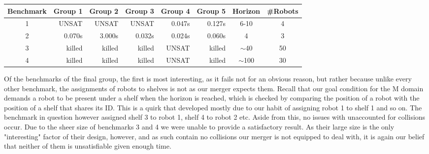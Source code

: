\documentclass{llncs}
\begin{document}
\begin{table}[]
\begin{tabular}{|c|r|r|r|r|r|c|c|}
\hline
\multicolumn{1}{|l|}{Benchmark} & \multicolumn{1}{l|}{Group 1} & \multicolumn{1}{l|}{Group 2} & \multicolumn{1}{l|}{Group 3} & \multicolumn{1}{l|}{Group 4} & \multicolumn{1}{l|}{Group 5} & Horizon   & \multicolumn{1}{l|}{\#Robots} \\ \hline
1                               & UNSAT                        & UNSAT                        & UNSAT                        & 0.047s                       & 0.127s                       & 6-10      & 4                             \\ \hline
2                               & 0.070s                       & 3.000s                       & 0.032s                       & 0.024s                       & 0.060s                       & 4         & 3                             \\ \hline
3                               & killed                       & killed                       & killed                       & UNSAT                        & killed                       & $\sim$40  & 50                            \\ \hline
4                               & killed                       & killed                       & killed                       & UNSAT                        & killed                       & $\sim$100 & 30                            \\ \hline
\end{tabular}
\end{table}
Of the benchmarks of the final group, the first is most interesting, as it fails not for an obvious reason, but rather because unlike every other benchmark, the assignments of robots to shelves is not as our merger expects them. Recall that our goal condition for the M domain demands a robot to be present under a shelf when the horizon is reached, which is checked by comparing the position of a robot with the position of a shelf that shares its ID. This is a quirk that developed mostly due to our habit of assigning robot 1 to shelf 1 and so on. The benchmark in question however assigned shelf 3 to robot 1, shelf 4 to robot 2 etc. Aside from this, no issues with unaccounted for collisions occur. \newline
Due to the sheer size of benchmarks 3 and 4 we were unable to provide a satisfactory result. As their large size is the only "interesting" factor of their design, however, and as such contain no collisions our merger is not equipped to deal with, it is again our belief that neither of them is unsatisfiable given enough time.
\end{document}
